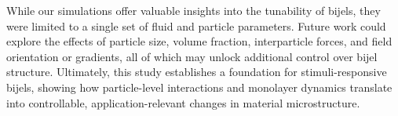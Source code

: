 While our simulations offer valuable insights into the tunability of bijels, they were limited to a single set of fluid and particle parameters. Future work could explore the 
effects of particle size, volume fraction, interparticle forces, and field orientation or gradients, all of which may unlock additional control over bijel structure.
Ultimately, this study establishes a foundation for stimuli-responsive bijels, showing how particle-level interactions and monolayer dynamics translate into controllable, 
application-relevant changes in material microstructure.